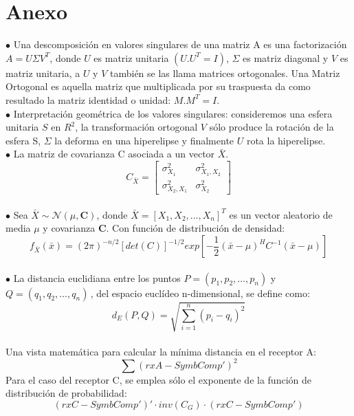 \documentclass	[12pt,A4paper,titlepage]{article}
\begin{document}
\section*{Anexo}
$\bullet$ Una descomposición en valores singulares de una matriz A es una factorización $A=U\Sigma V^T$, donde $U$ es matriz unitaria $(U.U^T=I)$, $\Sigma$ es matriz diagonal y $V$ es matriz unitaria, a $U$ y $V$ también se las llama matrices ortogonales. Una Matriz Ortogonal es aquella matriz que multiplicada por su traspuesta da como resultado la matriz identidad o unidad: $M.M^T=I$.
\\
$\bullet$ Interpretación geométrica de los valores singulares: consideremos una esfera unitaria $S$ en $R^2$, la transformación ortogonal $V$ sólo produce la rotación de la esfera S, $\Sigma$ la deforma en una hiperelipse y finalmente $U$ rota la hiperelipse.
\\
$\bullet$ La matriz de covarianza C asociada a un vector $\bar{X}$.
\begin{equation}
C_{\bar{X}} = 
\begin{bmatrix}
	\sigma_{X_1}^2 		& \sigma_{X_1,X_2}^2 \\
	\sigma_{X_2,X_1}^2 	& \sigma_{X_2}^2
\end{bmatrix}
\end{equation}
\\
$\bullet$ Sea $\bar{X} \sim \mathcal{N}(\mu,\textbf{C})$, donde $\bar{X}=\left[ X_1,X_2,\dots,X_n \right]^T$ es un vector aleatorio de media $\mu$ y covarianza $\textbf{C}$. Con función de distribución de densidad:
\begin{equation}
	f_{\bar{X}}(\bar{x})=
	(2\pi)^{-n/2} [\textit{det}(C)]^{-1/2} \textit{exp} \left[ -\dfrac{1}{2} (\bar{x}-\mu)^H C^{-1} (\bar{x}-\mu) \right] 
\end{equation}
\\
$\bullet$ La distancia euclidiana entre los puntos ${P=(p_{1},p_{2},\dots ,p_{n})}$ y ${Q=(q_{1},q_{2},\dots ,q_{n})\,}$, del espacio euclídeo n-dimensional, se define como:
\begin{equation}
d_{E}(P,Q)={\sqrt {\sum _{i=1}^{n}(p_{i}-q_{i})^{2}}}
\end{equation}
\\
Una vista matemática para calcular la mínima distancia en el receptor A: 
\[ \sum(rxA - SymbComp')^2 \]
Para el caso del receptor C, se emplea sólo el exponente de la función de distribución de probabilidad: 
\[ (rxC - SymbComp')' \cdot inv(C_G) \cdot (rxC - SymbComp') \]
\end{document}
